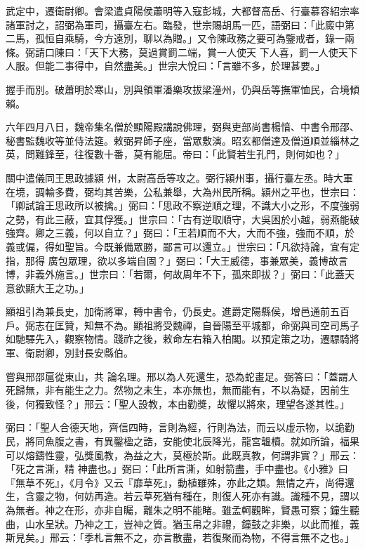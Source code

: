 \begin{pinyinscope}
 武定中，遷衛尉卿。會梁遣貞陽侯蕭明等入寇彭城，大都督高岳、行臺慕容紹宗率諸軍討之，詔弼為軍司，攝臺左右。臨發，世宗賜胡馬一匹，語弼曰：「此廄中第二馬，孤恒自乘騎，今方遠別，聊以為贈。」又令陳政務之要可為鑒戒者，錄一兩條。弼請口陳曰：「天下大務，莫過賞罰二端，賞一人使天
 下人喜，罰一人使天下人服。但能二事得中，自然盡美。」世宗大悅曰：「言雖不多，於理甚要。」



 握手而別。破蕭明於寒山，別與領軍潘樂攻拔梁潼州，仍與岳等撫軍恤民，合境傾賴。



 六年四月八日，魏帝集名僧於顯陽殿講說佛理，弼與吏部尚書楊愔、中書令邢邵、秘書監魏收等並侍法筵。敕弼昇師子座，當眾敷演。昭玄都僧達及僧道順並緇林之英，問難鋒至，往復數十番，莫有能屈。帝曰：「此賢若生孔門，則何如也？」



 關中遣儀同王思政據潁
 州，太尉高岳等攻之。弼行潁州事，攝行臺左丞。時大軍在境，調輸多費，弼均其苦樂，公私兼舉，大為州民所稱。潁州之平也，世宗曰：「卿試論王思政所以被擒。」弼曰：「思政不察逆順之理，不識大小之形，不度強弱之勢，有此三蔽，宜其俘獲。」世宗曰：「古有逆取順守，大吳困於小越，弱燕能破強齊。卿之三義，何以自立？」弼曰：「王若順而不大，大而不強，強而不順，於義或偏，得如聖旨。今既兼備眾勝，鄙言可以還立。」世宗曰：「凡欲持論，宜有定指，那得
 廣包眾理，欲以多端自固？」弼曰：「大王威德，事兼眾美，義博故言博，非義外施言。」世宗曰：「若爾，何故周年不下，孤來即拔？」弼曰：「此蓋天意欲顯大王之功。」



 顯祖引為兼長史，加衛將軍，轉中書令，仍長史。進爵定陽縣侯，增邑通前五百戶。弼志在匡贊，知無不為。顯祖將受魏禪，自晉陽至平城都，命弼與司空司馬子如馳驛先入，觀察物情。踐祚之後，敕命左右箱入柏閣。以預定策之功，遷驃騎將軍、衛尉卿，別封長安縣伯。



 嘗與邢邵扈從東山，共
 論名理。邢以為人死還生，恐為蛇畫足。弼答曰：「蓋謂人死歸無，非有能生之力。然物之未生，本亦無也，無而能有，不以為疑，因前生後，何獨致怪？」邢云：「聖人設教，本由勸獎，故懼以將來，理望各遂其性。」



 弼曰：「聖人合德天地，齊信四時，言則為經，行則為法，而云以虛示物，以詭勸民，將同魚腹之書，有異鑿楹之誥，安能使北辰降光，龍宮韞櫝。就如所論，福果可以熔鑄性靈，弘獎風教，為益之大，莫極於斯。此既真教，何謂非實？」邢云：「死之言澌，精
 神盡也。」弼曰：「此所言澌，如射箭盡，手中盡也。《小雅》曰『無草不死』，《月令》又云『靡草死』，動植雖殊，亦此之類。無情之卉，尚得還生，含靈之物，何妨再造。若云草死猶有種在，則復人死亦有識。識種不見，謂以為無者。神之在形，亦非自矚，離朱之明不能睹。雖孟軻觀眸，賢愚可察；鐘生聽曲，山水呈狀。乃神之工，豈神之質。猶玉帛之非禮，鐘鼓之非樂，以此而推，義斯見矣。」邢云：「季札言無不之，亦言散盡，若復聚而為物，不得言無不之也。」




\end{pinyinscope}
